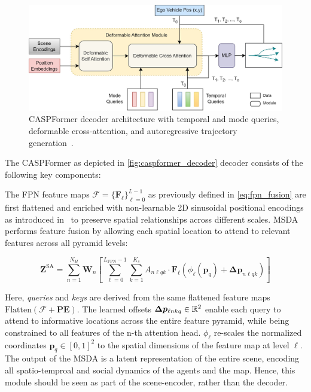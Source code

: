\begin{description}[leftmargin=1em,itemsep=2pt]
\begin{figure}[ht]
  \centering
  \includegraphics[width=0.85\linewidth]{figures/caspformer_decoder.jpg}
  \caption{CASPFormer decoder architecture with temporal and mode queries, deformable cross-attention, and autoregressive trajectory generation~\cite{caspformerYadav2024}.}
  \label{fig:caspformer_decoder}
\end{figure}

The CASPFormer as depicted in \autoref{fig:caspformer_decoder} decoder consists of the following key components:

\begin{description}[leftmargin=1em,itemsep=2pt]
\item[Multi-Scale Deformable Self-Attention (MSDA).] The FPN feature maps \(\boldsymbol{\mathcal{F}} = \{\mathbf{F}_\ell\}_{\ell=0}^{L-1}\) as previously defined in \autoref{eq:fpn_fusion} are first flattened and enriched with non-learnable 2D sinusoidal positional encodings as introduced in~\cite{vaswani2023attention} to preserve spatial relationships across different scales. MSDA performs feature fusion by allowing each spatial location to attend to relevant features across all pyramid levels:

\begin{equation}
\label{eq:msda_operation}
\mathbf{Z}^{\text{SA}} = \sum_{n=1}^{N_H} \mathbf{W}_{n} \left[\sum_{\ell=0}^{L_{\text{FPN}}-1} \sum_{k=1}^{K_s} A_{n\ell qk} \cdot \mathbf{F}_\ell(\phi_{\ell}(\mathbf{p}_q) + \boldsymbol{\Delta p}_{n\ell qk}) \right]
\end{equation}

Here, \emph{queries} and \emph{keys} are derived from the same flattened feature maps \(\text{Flatten}(\boldsymbol{\mathcal{F}} + \textbf{PE})\). The learned offsets \(\boldsymbol{\Delta p}_{\ell nkq} \in \mathbb{R}^2\) enable each query to attend to informative locations across the entire feature pyramid, while being constrained to all features of the n-th attention head. \( \phi_{\ell} \) re-scales the normalized coordinates \( \mathbf{p}_q \in [0,1]^2\) to the spatial dimensions of the feature map at level \(\ell\).\\
  The output of the MSDA is a latent representation of the entire scene, encoding all spatio-temproal and social dynamics of the agents and the map. Hence, this module should be seen as part of the scene-encoder, rather than the decoder.


\end{description}
\end{description}
